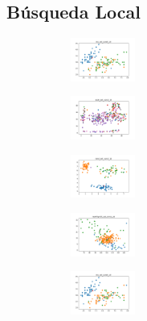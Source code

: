 \vspace*{\fill}
\newpage

\subsection{Búsqueda Local}

\begin{figure}[H]    
    \centering
    \begin{subfigure}
        \centering
        \includegraphics[width=0.234\textwidth]{img/bl/iris_set_const_10_949004259_clust.png}
    \end{subfigure}
    \hfill
    \begin{subfigure}
        \centering
        \includegraphics[width=0.234\textwidth]{img/bl/ecoli_set_const_10_949004259_clust.png}
    \end{subfigure}
    \hfill
    \begin{subfigure}
        \centering
        \includegraphics[width=0.234\textwidth]{img/bl/rand_set_const_10_949004259_clust.png}
    \end{subfigure}
    \hfill
    \begin{subfigure}
        \centering
        \includegraphics[width=0.234\textwidth]{img/bl/newthyroid_set_const_10_949004259_clust.png}
    \end{subfigure}
    \hfill
    \begin{subfigure}
        \centering
        \includegraphics[width=0.234\textwidth]{img/bl/iris_set_const_10_589741062_clust.png}

\end{subfigure}
\end{figure}
